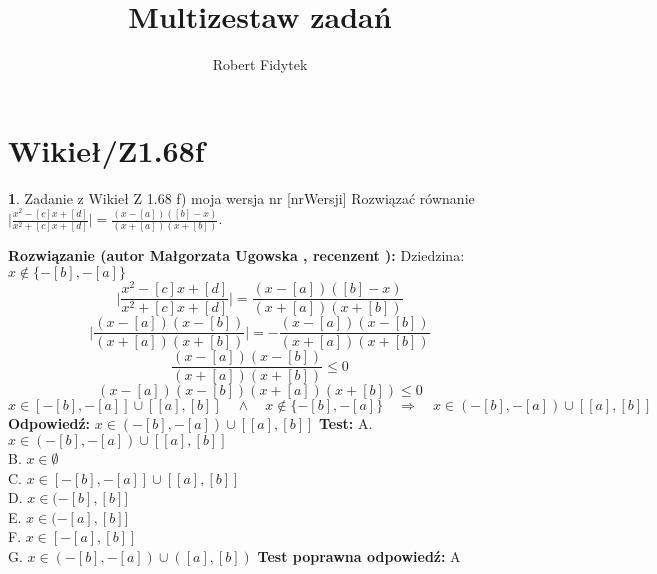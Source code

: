 \documentclass[12pt, a4paper]{article}
\title{Multizestaw zadań}
\author{Robert Fidytek}
\date{}
\theoremstyle{definition} %
\newtheorem{zad}{}
\newcommand{\kategoria}[1]{\section{#1}} %
\newcommand{\zadStart}[1]{\begin{zad}#1\newline} %
\newcommand{\zadStop}{\end{zad}}   %
\newcommand{\rozwStart}[2]{\noindent \textbf{Rozwiązanie (autor #1 , recenzent #2): }\newline} %
\newcommand{\rozwStop}{\newline}                                            %
\newcommand{\odpStart}{\noindent \textbf{Odpowiedź:}\newline}    %
\newcommand{\odpStop}{\newline}                                             %
\newcommand{\testStart}{\noindent \textbf{Test:}\newline} %
\newcommand{\testStop}{\newline} %
\newcommand{\kluczStart}{\noindent \textbf{Test poprawna odpowiedź:}\newline} %
\newcommand{\kluczStop}{\newline} %
\begin{document}
\maketitle


\kategoria{Wikieł/Z1.68f}
\zadStart{Zadanie z Wikieł Z 1.68 f) moja wersja nr [nrWersji]}
Rozwiązać równanie $\Big| \frac{x^2-[c]x+[d]}{x^2+[c]x+[d]} \Big| = \frac{(x-[a])([b]-x)}{(x+[a])(x+[b])}$.
\zadStop
\rozwStart{Małgorzata Ugowska}{}
Dziedzina: $ x \notin\{ -[b], -[a]\}$
$$\Big| \frac{x^2-[c]x+[d]}{x^2+[c]x+[d]} \Big| = \frac{(x-[a])([b]-x)}{(x+[a])(x+[b])}$$
$$\Big| \frac{(x-[a])(x-[b])}{(x+[a])(x+[b])}\Big| = - \frac{(x-[a])(x-[b])}{(x+[a])(x+[b])}$$
$$\frac{(x-[a])(x-[b])}{(x+[a])(x+[b])} \le 0$$
$$(x-[a])(x-[b])(x+[a])(x+[b]) \le 0$$
$$x \in [-[b],-[a]] \cup [[a], [b]] \quad \land \quad x \notin\{ -[b], -[a]\} \quad \Longrightarrow \quad x \in (-[b],-[a]) \cup [[a], [b]] $$
\rozwStop
\odpStart
$x \in (-[b],-[a]) \cup [[a], [b]]$
\odpStop
\testStart
A. $x \in (-[b],-[a]) \cup [[a], [b]]$\\
B. $x \in \emptyset $\\
C. $x \in [-[b],-[a]] \cup [[a], [b]]$\\
D. $x \in (-[b], [b]]$\\
E. $x \in (-[a], [b]]$\\
F. $x \in [-[a], [b]]$\\
G. $x \in (-[b],-[a]) \cup ([a], [b])$
\testStop
\kluczStart
A
\kluczStop
\end{document}
